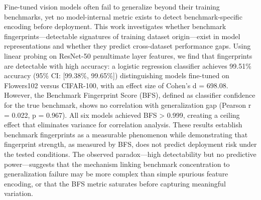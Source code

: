 
Fine-tuned vision models often fail to generalize beyond their training benchmarks, yet no model-internal metric exists to detect benchmark-specific encoding before deployment. This work investigates whether benchmark fingerprints---detectable signatures of training dataset origin---exist in model representations and whether they predict cross-dataset performance gaps. Using linear probing on ResNet-50 penultimate layer features, we find that fingerprints are detectable with high accuracy: a logistic regression classifier achieves 99.51\% accuracy (95\% CI: [99.38\%, 99.65\%]) distinguishing models fine-tuned on Flowers102 versus CIFAR-100, with an effect size of Cohen's d = 698.08. However, the Benchmark Fingerprint Score (BFS), defined as classifier confidence for the true benchmark, shows no correlation with generalization gap (Pearson r = 0.022, p = 0.967). All six models achieved BFS > 0.999, creating a ceiling effect that eliminates variance for correlation analysis. These results establish benchmark fingerprints as a measurable phenomenon while demonstrating that fingerprint strength, as measured by BFS, does not predict deployment risk under the tested conditions. The observed paradox---high detectability but no predictive power---suggests that the mechanism linking benchmark concentration to generalization failure may be more complex than simple spurious feature encoding, or that the BFS metric saturates before capturing meaningful variation.

